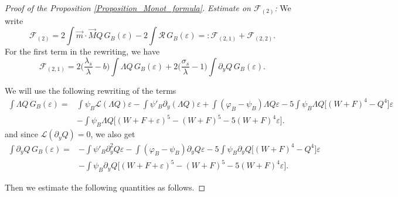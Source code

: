 \documentclass[16pt,english, oneside,reqno]{smfart}
\newcommand{\vare}{{\varepsilon}}
\newcommand{\vphi}{{\varphi}}
\begin{document}
\begin{proof}[Proof of the Proposition \ref{Proposition_Monot_formula}]
\textit{Estimate on $\mathcal{F}_{(2)}$:} 
We write 
\begin{equation}
    \mathcal{F}_{(2)} = 2 \int \vec{m}\cdot \vec{M}Q \, G_B(\vare) - 2 \int \mathcal{R} \, G_B(\vare) = : \mathcal{F}_{(2,1)} + \mathcal{F}_{(2,2)}.
\end{equation}
For the first term in the rewriting, we have
\begin{equation}
    \mathcal{F}_{(2,1)} = 
    2 \Big( \frac{\lambda_s}{\lambda} - b \Big)\int \Lambda Q \, G_B(\vare) + 2 \Big( \frac{\sigma_s}{\lambda}-1 \Big)\int \partial_y Q \, G_B(\vare).
\end{equation}

We will use the following rewriting of the terms
\begin{equation}
    \begin{split}
        \int \Lambda Q \, G_B(\vare) 
        = & \int \psi_B \mathcal{L}(\Lambda Q) \vare  - \int \psi'_B \partial_y(\Lambda Q) \vare + \int (\vphi_B-\psi_B) \Lambda Q \vare - 5 \int \psi_B \Lambda Q \big[(W+F)^4 - Q^4 \big] \vare  \\
        & - \int \psi_B \Lambda Q \big[ (W+F+\vare)^5 - (W+F)^5 - 5(W+F)^4 \vare \big].
    \end{split}
\end{equation}
and since $\mathcal{L}(\partial_y Q) = 0$, we also get
\begin{equation}
    \begin{split}
        \int \partial_y Q\, G_B(\vare) 
        =  & -\int \psi'_B \partial^2_y Q \vare - \int (\vphi_B - \psi_B) \partial_y Q \vare - 5 \int \psi_B \partial_y Q \big[(W+F)^4 - Q^4 \big] \vare \\
        &  - \int \psi_B \partial_y Q \big[ (W+F+\vare)^5 - (W+F)^5 - 5(W+F)^4 \vare \big].
    \end{split}
\end{equation}

Then we estimate the following quantities as follows.


\end{proof}
\end{document}
